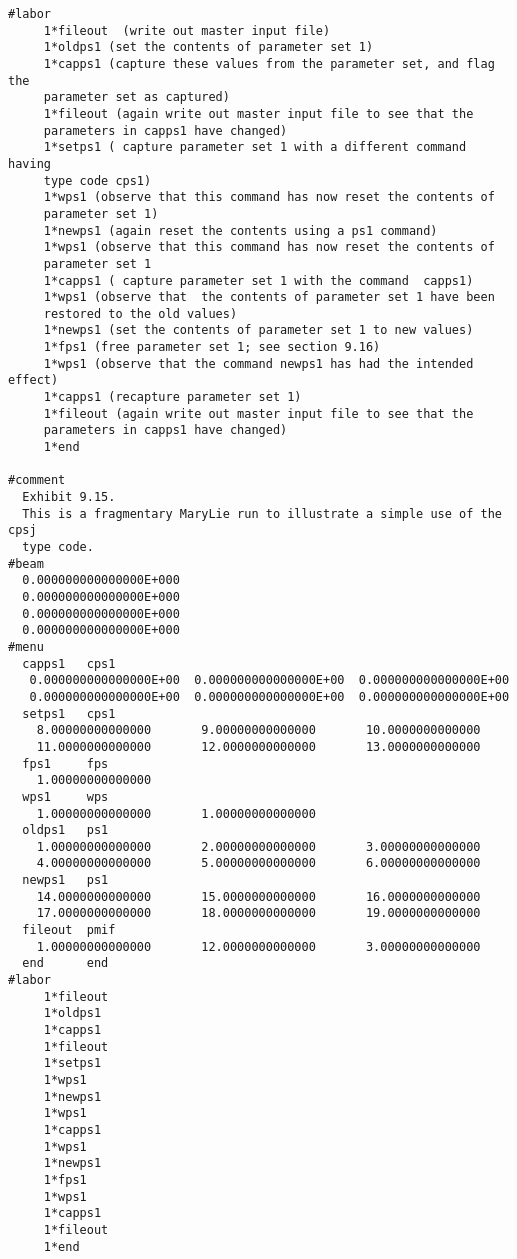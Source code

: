 \vspace{5mm}
\begin{footnotesize}
\begin{verbatim}
#labor
     1*fileout  (write out master input file)
     1*oldps1 (set the contents of parameter set 1)
     1*capps1 (capture these values from the parameter set, and flag the
     parameter set as captured)
     1*fileout (again write out master input file to see that the
     parameters in capps1 have changed)
     1*setps1 ( capture parameter set 1 with a different command having
     type code cps1)
     1*wps1 (observe that this command has now reset the contents of
     parameter set 1)
     1*newps1 (again reset the contents using a ps1 command)
     1*wps1 (observe that this command has now reset the contents of
     parameter set 1
     1*capps1 ( capture parameter set 1 with the command  capps1)
     1*wps1 (observe that  the contents of parameter set 1 have been
     restored to the old values)
     1*newps1 (set the contents of parameter set 1 to new values)
     1*fps1 (free parameter set 1; see section 9.16)
     1*wps1 (observe that the command newps1 has had the intended effect)
     1*capps1 (recapture parameter set 1)
     1*fileout (again write out master input file to see that the
     parameters in capps1 have changed)
     1*end

#comment
  Exhibit 9.15.
  This is a fragmentary MaryLie run to illustrate a simple use of the cpsj
  type code.
#beam
  0.000000000000000E+000
  0.000000000000000E+000
  0.000000000000000E+000
  0.000000000000000E+000
#menu
  capps1   cps1
   0.000000000000000E+00  0.000000000000000E+00  0.000000000000000E+00
   0.000000000000000E+00  0.000000000000000E+00  0.000000000000000E+00
  setps1   cps1
    8.00000000000000       9.00000000000000       10.0000000000000
    11.0000000000000       12.0000000000000       13.0000000000000
  fps1     fps
    1.00000000000000
  wps1     wps
    1.00000000000000       1.00000000000000
  oldps1   ps1
    1.00000000000000       2.00000000000000       3.00000000000000
    4.00000000000000       5.00000000000000       6.00000000000000
  newps1   ps1
    14.0000000000000       15.0000000000000       16.0000000000000
    17.0000000000000       18.0000000000000       19.0000000000000
  fileout  pmif
    1.00000000000000       12.0000000000000       3.00000000000000
  end      end
#labor
     1*fileout
     1*oldps1
     1*capps1
     1*fileout
     1*setps1
     1*wps1
     1*newps1
     1*wps1
     1*capps1
     1*wps1
     1*newps1
     1*fps1
     1*wps1
     1*capps1
     1*fileout
     1*end


\end{verbatim}
\end{footnotesize}
